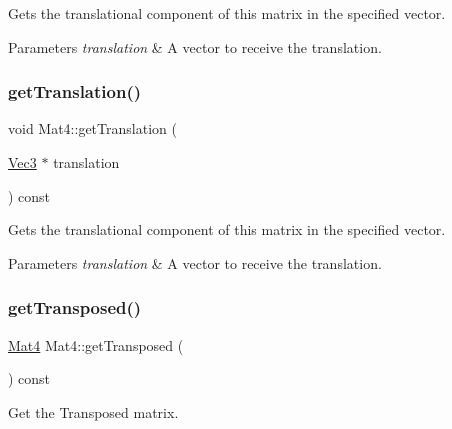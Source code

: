 Gets the translational component of this matrix in the specified vector.


\begin{DoxyParams}{Parameters}
{\em translation} & A vector to receive the translation. \\
\hline
\end{DoxyParams}
\mbox{\label{classMat4_a92b33d42c6766de2183ebd53269fb96c}} 
\subsubsection{\texorpdfstring{get\+Translation()}{getTranslation()}\hspace{0.1cm}{\footnotesize\ttfamily [2/2]}}
{\footnotesize\ttfamily void Mat4\+::get\+Translation (\begin{DoxyParamCaption}\item[{\hyperlink{classVec3}{Vec3} $\ast$}]{translation }\end{DoxyParamCaption}) const}

Gets the translational component of this matrix in the specified vector.


\begin{DoxyParams}{Parameters}
{\em translation} & A vector to receive the translation. \\
\hline
\end{DoxyParams}
\mbox{\label{classMat4_a483b4b6142791d63aad164d917bfcdb8}} 
\subsubsection{\texorpdfstring{get\+Transposed()}{getTransposed()}\hspace{0.1cm}{\footnotesize\ttfamily [1/2]}}
{\footnotesize\ttfamily \hyperlink{classMat4}{Mat4} Mat4\+::get\+Transposed (\begin{DoxyParamCaption}{ }\end{DoxyParamCaption}) const}

Get the Transposed matrix. \mbox{\label{classMat4_a483b4b6142791d63aad164d917bfcdb8}} 
